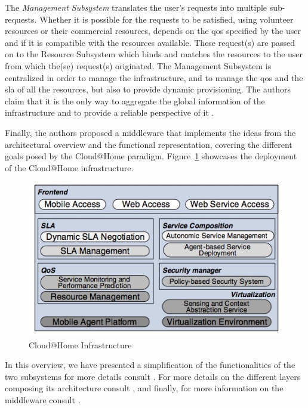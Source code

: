 \documentclass[12pt, titlepage]{uo_temp}
\begin{document}
     The \emph{Management Subsystem} translates the user's requests into multiple
     sub-requests. Whether it is possible for the requests to be satisfied, using
     volunteer resources or their commercial resources, depends on the \gls{qos} specified
     by the user and if it is compatible with the resources available. These request(s)
     are passed on to the Resource Subsystem which binds and matches the resources to the
     user from which the(se) request(s) originated. The Management Subsystem is
     centralized in order to manage the infrastructure, and to manage the \gls{qos} and
     the \gls{sla} of all the resources, but also to provide dynamic provisioning. The
     authors claim that it is the only way to aggregate the global information of the
     infrastructure and to provide a reliable perspective of it \cite{cunsolo2010open}.

     Finally, the authors proposed a middleware that implements the ideas from the architectural
     overview and the functional representation, covering the different goals posed by the
     Cloud@Home paradigm. Figure~\ref{cathome_infra} showcases the deployment of the Cloud@Home
     infrastructure.
     
     \begin{figure}[h]
       \includegraphics{images/cathome_infra.jpg}
       \caption{Cloud@Home Infrastructure \label{cathome_infra}}
     \end{figure}

     In this overview, we have presented a simplification of the functionalities of the
     two subsystems for more details consult \cite{cunsolo2010open}. For more details on
     the different layers composing its architecture consult \cite{aversa2011cloud}, and
     finally, for more information on the middleware consult \cite{cunsolo2010applying}.
\end{document}
